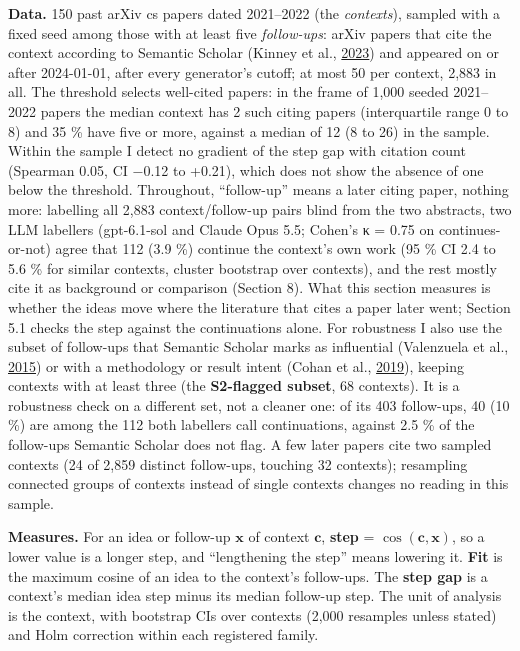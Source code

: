 \documentclass[
  10pt,
]{article}
\begin{document}
\textbf{Data.} 150 past arXiv cs papers
dated 2021--2022 (the \emph{contexts}),
sampled with a fixed seed among those
with at least five \emph{follow-ups}:
arXiv papers that cite the context
according to Semantic Scholar (Kinney et
al., \hyperlink{ref-Kinney2023}{2023})
and appeared on or after 2024-01-01,
after every generator's cutoff; at most
50 per context, 2,883 in all. The
threshold selects well-cited papers: in
the frame of 1,000 seeded 2021--2022
papers the median context has 2 such
citing papers (interquartile range 0 to
8) and 35 \% have five or more, against
a median of 12 (8 to 26) in the sample.
Within the sample I detect no gradient
of the step gap with citation count
(Spearman 0.05, CI −0.12 to +0.21),
which does not show the absence of one
below the threshold. Throughout,
``follow-up'' means a later citing
paper, nothing more: labelling all 2,883
context/follow-up pairs blind from the
two abstracts, two LLM labellers
(gpt-6.1-sol and Claude Opus 5.5;
Cohen's κ = 0.75 on continues-or-not)
agree that 112 (3.9 \%) continue the
context's own work (95 \% CI 2.4 to 5.6
\% for similar contexts, cluster
bootstrap over contexts), and the rest
mostly cite it as background or
comparison (Section 8). What this
section measures is whether the ideas
move where the literature that cites a
paper later went; Section 5.1 checks the
step against the continuations alone.
For robustness I also use the subset of
follow-ups that Semantic Scholar marks
as influential (Valenzuela et al.,
\hyperlink{ref-Valenzuela2015}{2015}) or
with a methodology or result intent
(Cohan et al.,
\hyperlink{ref-Cohan2019}{2019}),
keeping contexts with at least three
(the \textbf{S2-flagged subset}, 68
contexts). It is a robustness check on a
different set, not a cleaner one: of its
403 follow-ups, 40 (10 \%) are among the
112 both labellers call continuations,
against 2.5 \% of the follow-ups
Semantic Scholar does not flag. A few
later papers cite two sampled contexts
(24 of 2,859 distinct follow-ups,
touching 32 contexts); resampling
connected groups of contexts instead of
single contexts changes no reading in
this sample.

\textbf{Measures.} For an idea or
follow-up \(\mathbf{x}\) of context
\(\mathbf{c}\), \textbf{step} =
\(\cos(\mathbf{c},
\mathbf{x})\), so a lower value is a
longer step, and ``lengthening the
step'' means lowering it. \textbf{Fit}
is the maximum cosine of an idea to the
context's follow-ups. The \textbf{step
gap} is a context's median idea step
minus its median follow-up step. The
unit of analysis is the context, with
bootstrap CIs over contexts (2,000
resamples unless stated) and Holm
correction within each registered
family.
\end{document}
